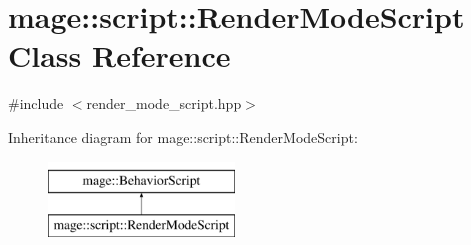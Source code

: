 \hypertarget{classmage_1_1script_1_1_render_mode_script}{}\section{mage\+:\+:script\+:\+:Render\+Mode\+Script Class Reference}
\label{classmage_1_1script_1_1_render_mode_script}


{\ttfamily \#include $<$render\+\_\+mode\+\_\+script.\+hpp$>$}

Inheritance diagram for mage\+:\+:script\+:\+:Render\+Mode\+Script\+:\begin{figure}[H]
\begin{center}
\leavevmode
\includegraphics[height=2.000000cm]{classmage_1_1script_1_1_render_mode_script}
\end{center}
\end{figure}
